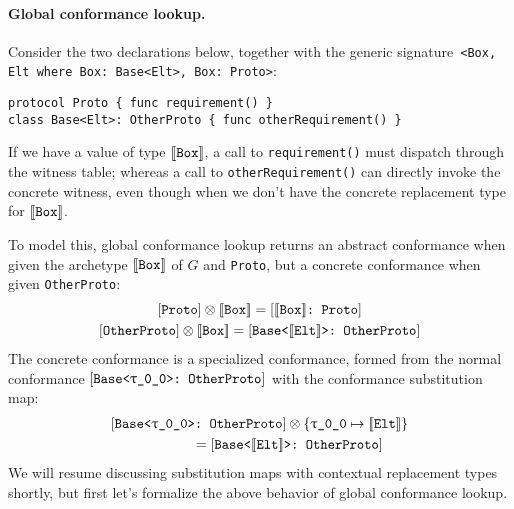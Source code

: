 \documentclass[../generics]{subfiles}
\begin{document}
\paragraph{Global conformance lookup.} Consider the two declarations below, together with the generic signature~\verb|<Box, Elt where Box: Base<Elt>, Box: Proto>|:
\begin{Verbatim}
protocol Proto { func requirement() }
class Base<Elt>: OtherProto { func otherRequirement() }
\end{Verbatim}
If we have a value of type $[\![\texttt{Box}]\!]$, a call to \texttt{requirement()} must dispatch through the witness table; whereas a call to \texttt{otherRequirement()} can directly invoke the concrete witness, even though when we don't have the concrete replacement type for $[\![\texttt{Box}]\!]$.

To model this, global conformance lookup returns an abstract conformance when given the archetype $[\![\texttt{Box}]\!]$ of $G$ and \texttt{Proto}, but a concrete conformance when given \texttt{OtherProto}:
\begin{gather*}
\protosym{Proto}\otimes \archetype{Box} = \ConfReq{$\archetype{Box}$}{Proto}\\
\protosym{OtherProto}\otimes \archetype{Box} = \ConfReq{Base<$\archetype{Elt}$>}{OtherProto}
\end{gather*}
The concrete conformance is a specialized conformance, formed from the normal conformance $\ConfReq{Base<\rT>}{OtherProto}$ with the conformance substitution map:
\begin{gather*}
\ConfReq{Base<\rT>}{OtherProto}\otimes\SubstMap{\SubstType{\rT}{$\archetype{Elt}$}}\\
\qquad\qquad {} = \ConfReq{Base<$\archetype{Elt}$>}{OtherProto}
\end{gather*}
We will resume discussing substitution maps with contextual replacement types shortly, but first let's formalize the above behavior of global conformance lookup.
\end{document}
